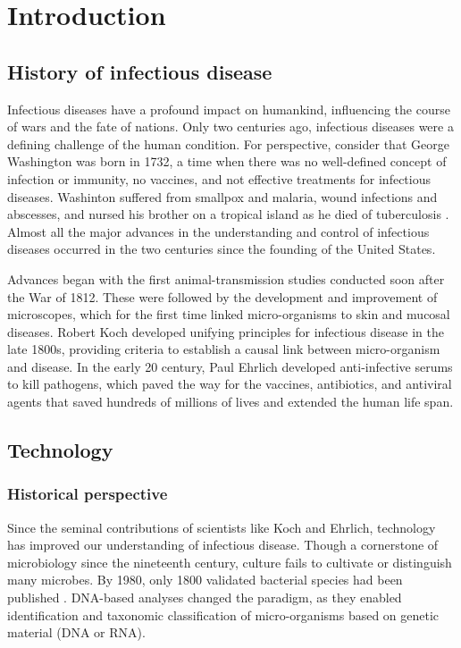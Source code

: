 
\chapter{Introduction}

\section{History of infectious disease}

Infectious diseases have a profound impact on humankind, influencing the course of wars and the fate of nations. Only two centuries ago, infectious diseases were a defining challenge of the human condition. For perspective, consider that George Washington was born in 1732, a time when there was no well-defined concept of infection or immunity, no vaccines, and not effective treatments for infectious diseases. Washinton suffered from smallpox and malaria, wound infections and abscesses, and nursed his brother on a tropical island as he died of tuberculosis \cite{Fauci:2012us}. Almost all the major advances in the understanding and control of infectious diseases occurred in the two centuries since the founding of the United States. 

Advances began with the first animal-transmission studies conducted soon after the War of 1812. These were followed by the development and improvement of microscopes, which for the first time linked micro-organisms to skin and mucosal diseases. Robert Koch developed unifying principles for infectious disease in the late 1800s, providing criteria to establish a causal link between micro-organism and disease. In the early 20 century, Paul Ehrlich developed anti-infective serums to kill pathogens, which paved the way for the vaccines, antibiotics, and antiviral agents that saved hundreds of millions of lives and extended the human life span.

\section{Technology}

\subsection{Historical perspective}

Since the seminal contributions of scientists like Koch and Ehrlich, technology has improved our understanding of infectious disease. Though a cornerstone of microbiology since the nineteenth century, culture fails to cultivate or distinguish many microbes. By 1980, only 1800 validated bacterial species had been published \cite{Fournier:2013ew}. DNA-based analyses changed the paradigm, as they enabled identification and taxonomic classification of micro-organisms based on genetic material (DNA or RNA). 

